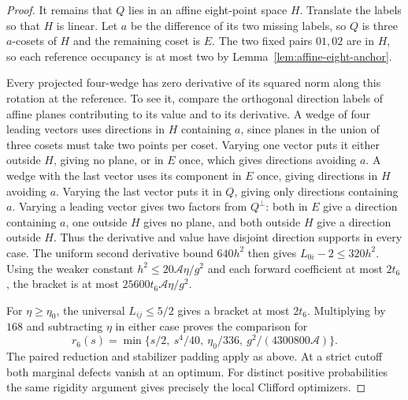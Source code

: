 \begin{proof}
It remains that \(Q\) lies in an affine eight-point space \(H\).
Translate the labels so that \(H\) is linear.
Let \(a\) be the difference of its two missing labels, so \(Q\)
is three \(a\)-cosets of \(H\) and the remaining coset is \(E\).
The two fixed pairs \(01,02\) are in \(H\), so each reference
occupancy is at most two by Lemma~\ref{lem:affine-eight-anchor}.

Every projected four-wedge has zero derivative of its squared
norm along this rotation at the reference. To see it, compare
the orthogonal direction labels of affine planes contributing
to its value and to its derivative. A wedge of four leading
vectors uses directions in \(H\) containing \(a\), since planes
in the union of three cosets must take two points per coset.
Varying one vector puts it either outside \(H\), giving no
plane, or in \(E\) once, which gives directions avoiding \(a\).
A wedge with the last vector uses its component in \(E\) once,
giving directions in \(H\) avoiding \(a\). Varying the last
vector puts it in \(Q\), giving only directions containing \(a\).
Varying a leading vector gives two factors from \(Q^\perp\):
both in \(E\) give a direction containing \(a\), one outside
\(H\) gives no plane, and both outside \(H\) give a direction
outside \(H\). Thus the derivative and value have disjoint
direction supports in every case.
The uniform second derivative bound \(640h^2\) then gives
\(L_{0i}-2\le320h^2\). Using the weaker constant
\(h^2\le20\mathcal A\eta/g^2\) and each forward coefficient at
most \(2t_6\), the bracket is at most
\(25600t_6\mathcal A\eta/g^2\).

For \(\eta\ge\eta_0\), the universal \(L_{ij}\le5/2\) gives a
bracket at most \(2t_6\). Multiplying by \(168\) and subtracting
\(\eta\) in either case proves the comparison for
\[
 r_6(s)=\min\{s/2,\ s^4/40,\ \eta_0/336,\
                                      g^2/(4300800\mathcal A)\}.
\]
The paired reduction and stabilizer padding apply as above.
At a strict cutoff both marginal defects vanish at an optimum.
For distinct positive probabilities the same rigidity argument
gives precisely the local Clifford optimizers.
\end{proof}
